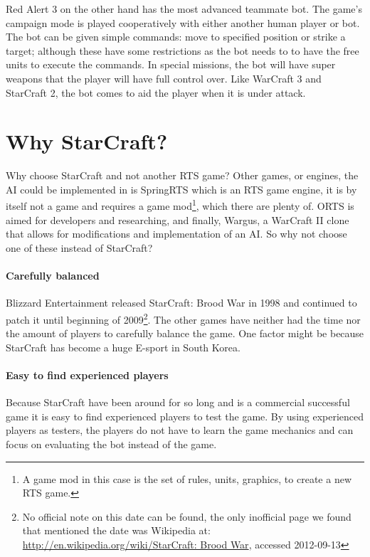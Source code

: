 Red Alert 3\cite{redalert3} on the other hand has the most advanced teammate bot. The game’s campaign mode is played cooperatively with either another human player or bot. The bot can be given simple commands: move to specified position or strike a target; although these have some restrictions as the bot needs to to have the free units to execute the commands. In special missions, the bot will have super weapons that the player will have full control over. Like WarCraft 3 and StarCraft 2, the bot comes to aid the player when it is under attack.

\section{Why StarCraft?}
\label{sec:why_starcraft}	
Why choose StarCraft and not another RTS game? Other games, or engines, the AI could be implemented in is SpringRTS\cite{springrts} which is an RTS game engine, it is by itself not a game and requires a game mod\footnote{A game mod in this case is the set of rules, units, graphics, to create a new RTS game.}, which there are plenty of. ORTS\cite{orts} is aimed for developers and researching, and finally, Wargus\cite{wargus}, a WarCraft II clone that allows for modifications and implementation of an AI. So why not choose one of these instead of StarCraft?

\paragraph{Carefully balanced}
Blizzard Entertainment released StarCraft: Brood War in 1998 and continued to patch it until beginning of 2009\footnote{No official note on this date can be found, the only inofficial page we found that mentioned the date was Wikipedia at: \url{http://en.wikipedia.org/wiki/StarCraft: Brood War}, accessed 2012-09-13}. The other games have neither had the time nor the amount of players to carefully balance the game. One factor might be because StarCraft has become a huge E-sport in South Korea\cite{scKotakuKorea}.

\paragraph{Easy to find experienced players}
Because StarCraft have been around for so long and is a commercial successful game it is easy to find experienced players to test the game. By using experienced players as testers, the players do not have to learn the game mechanics and can focus on evaluating the bot instead of the game.

